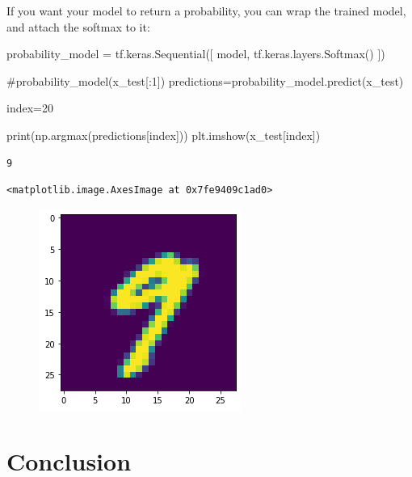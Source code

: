 \documentclass[
  letterpaper,
  DIV=11,
  numbers=noendperiod]{scrreprt}
\newenvironment{Shaded}{\begin{snugshade}}{\end{snugshade}}
\newcommand{\BuiltInTok}[1]{\textcolor[rgb]{0.00,0.23,0.31}{#1}}
\newcommand{\CommentTok}[1]{\textcolor[rgb]{0.37,0.37,0.37}{#1}}
\newcommand{\DecValTok}[1]{\textcolor[rgb]{0.68,0.00,0.00}{#1}}
\newcommand{\NormalTok}[1]{\textcolor[rgb]{0.00,0.23,0.31}{#1}}
\newcommand{\OperatorTok}[1]{\textcolor[rgb]{0.37,0.37,0.37}{#1}}
\begin{document}
If you want your model to return a probability, you can wrap the trained
model, and attach the softmax to it:

\begin{Shaded}
\begin{Highlighting}[]
\NormalTok{probability\_model }\OperatorTok{=}\NormalTok{ tf.keras.Sequential([}
\NormalTok{  model,}
\NormalTok{  tf.keras.layers.Softmax()}
\NormalTok{])}
\end{Highlighting}
\end{Shaded}

\begin{Shaded}
\begin{Highlighting}[]
\CommentTok{\#probability\_model(x\_test[:1])}
\NormalTok{predictions}\OperatorTok{=}\NormalTok{probability\_model.predict(x\_test)}

\NormalTok{index}\OperatorTok{=}\DecValTok{20}

\BuiltInTok{print}\NormalTok{(np.argmax(predictions[index]))}
\NormalTok{plt.imshow(x\_test[index])}
\end{Highlighting}
\end{Shaded}

\begin{verbatim}
9
\end{verbatim}

\begin{verbatim}
<matplotlib.image.AxesImage at 0x7fe9409c1ad0>
\end{verbatim}

\begin{figure}[H]

{\centering \includegraphics{notebooks/W10. Machine Learning_files/figure-pdf/cell-15-output-3.png}

}

\end{figure}

\hypertarget{conclusion}{%
\section{Conclusion}\label{conclusion}}
\end{document}
